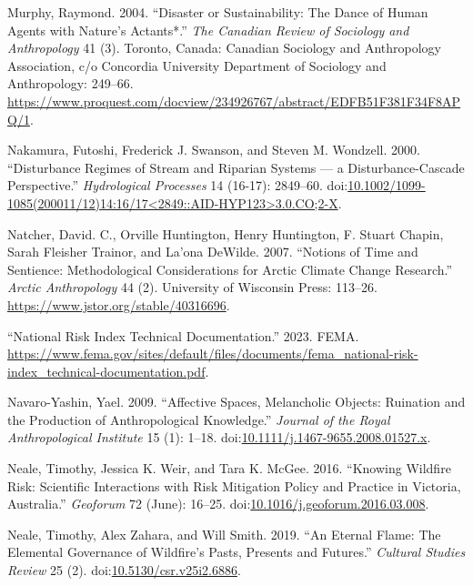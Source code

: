 \documentclass[
]{article}
\newlength{\cslhangindent}
\newenvironment{CSLReferences}[2] %
 {\begin{list}{}{%
  \setlength{\itemindent}{0pt}
  \setlength{\leftmargin}{0pt}
  \setlength{\parsep}{0pt}
  \ifodd #1
   \setlength{\leftmargin}{\cslhangindent}
   \setlength{\itemindent}{-1\cslhangindent}
  \fi
  \setlength{\itemsep}{#2\baselineskip}}}
 {\end{list}}
\begin{document}
\begin{CSLReferences}{1}{0}
Murphy, Raymond. 2004. {``Disaster or {Sustainability}: {The Dance} of {Human Agents} with {Nature}'s {Actants}*.''} \emph{The Canadian Review of Sociology and Anthropology} 41 (3). Toronto, Canada: {Canadian Sociology and Anthropology Association, c/o Concordia University Department of Sociology and Anthropology}: 249--66. \url{https://www.proquest.com/docview/234926767/abstract/EDFB51F381F34F8APQ/1}.

Nakamura, Futoshi, Frederick J. Swanson, and Steven M. Wondzell. 2000. {``Disturbance Regimes of Stream and Riparian Systems --- a Disturbance-Cascade Perspective.''} \emph{Hydrological Processes} 14 (16-17): 2849--60. doi:\href{https://doi.org/10.1002/1099-1085(200011/12)14:16/17\%3C2849::AID-HYP123\%3E3.0.CO;2-X}{10.1002/1099-1085(200011/12)14:16/17\textless2849::AID-HYP123\textgreater3.0.CO;2-X}.

Natcher, David. C., Orville Huntington, Henry Huntington, F. Stuart Chapin, Sarah Fleisher Trainor, and La'ona DeWilde. 2007. {``Notions of {Time} and {Sentience}: {Methodological Considerations} for {Arctic Climate Change Research}.''} \emph{Arctic Anthropology} 44 (2). University of Wisconsin Press: 113--26. \url{https://www.jstor.org/stable/40316696}.

{``National {Risk Index Technical Documentation}.''} 2023. FEMA. \url{https://www.fema.gov/sites/default/files/documents/fema_national-risk-index_technical-documentation.pdf}.

Navaro-Yashin, Yael. 2009. {``Affective Spaces, Melancholic Objects: {Ruination} and the Production of Anthropological Knowledge.''} \emph{Journal of the Royal Anthropological Institute} 15 (1): 1--18. doi:\href{https://doi.org/10.1111/j.1467-9655.2008.01527.x}{10.1111/j.1467-9655.2008.01527.x}.

Neale, Timothy, Jessica K. Weir, and Tara K. McGee. 2016. {``Knowing Wildfire Risk: {Scientific} Interactions with Risk Mitigation Policy and Practice in {Victoria}, {Australia}.''} \emph{Geoforum} 72 (June): 16--25. doi:\href{https://doi.org/10.1016/j.geoforum.2016.03.008}{10.1016/j.geoforum.2016.03.008}.

Neale, Timothy, Alex Zahara, and Will Smith. 2019. {``An {Eternal Flame}: {The Elemental Governance} of {Wildfire}'s {Pasts}, {Presents} and {Futures}.''} \emph{Cultural Studies Review} 25 (2). doi:\href{https://doi.org/10.5130/csr.v25i2.6886}{10.5130/csr.v25i2.6886}.


\end{CSLReferences}
\end{document}
